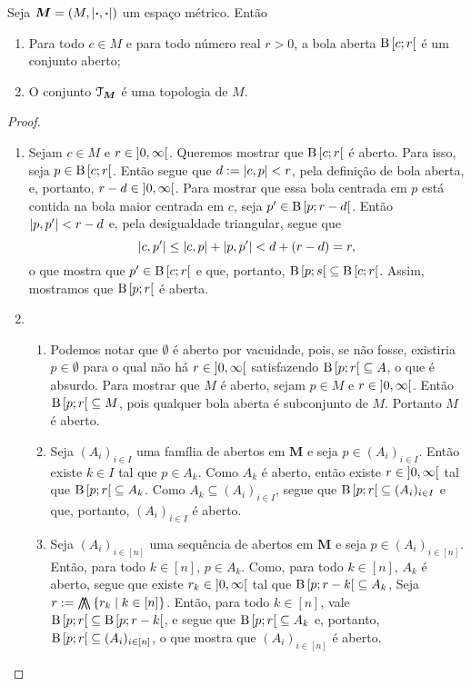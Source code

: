 \begin{proposition}
Seja $\bm M = (M,\left\vert{\bm{\cdot}},{\bm{\cdot}}\right\vert)$ um espaço métrico. Então
	\begin{enumerate}
	\item Para todo $c \in M$ e para todo número real $r > 0$, a bola aberta $\mathrm{B}\left[{c};{r}\right[$ é um conjunto aberto;
	\item O conjunto $\mathcal{T}_{\bm M}$ é uma topologia de $M$.
	\end{enumerate}
\end{proposition}
\begin{proof}
	\begin{enumerate}
	\item Sejam $c \in M$ e $r \in \left]{0},{\infty}\right[$. Queremos mostrar que $\mathrm{B}\left[{c};{r}\right[$ é aberto. Para isso, seja $p \in \mathrm{B}\left[{c};{r}\right[$. Então segue que $d := \left\vert{c},{p}\right\vert < r$, pela definição de bola aberta, e, portanto, $r-d \in \left]{0},{\infty}\right[$. Para mostrar que essa bola centrada em $p$ está contida na bola maior centrada em $c$, seja $p' \in \mathrm{B}\left[{p};{r-d}\right[$. Então $\left\vert{p},{p'}\right\vert<r-d$ e, pela desigualdade triangular, segue que
	\begin{equation*}
	\left\vert{c},{p'}\right\vert \leq \left\vert{c},{p}\right\vert + \left\vert{p},{p'}\right\vert < d + (r-d) = r,
	\end{equation*}
o que mostra que $p' \in \mathrm{B}\left[{c};{r}\right[$ e que, portanto, $\mathrm{B}\left[{p};{s}\right[ \subseteq \mathrm{B}\left[{c};{r}\right[$. Assim, mostramos que $\mathrm{B}\left[{p};{r}\right[$ é aberta.
	
	\item
		\begin{enumerate}
		\item Podemos notar que $\emptyset$ é aberto por vacuidade, pois, se não fosse, existiria $p \in \emptyset$ para o qual não há $r \in \left]{0},{\infty}\right[$ satisfazendo $\mathrm{B}\left[{p};{r}\right[ \subseteq A$, o que é absurdo.
	Para mostrar que $M$ é aberto, sejam $p \in M$ e $r \in \left]{0},{\infty}\right[$. Então $\mathrm{B}\left[{p};{r}\right[ \subseteq M$, pois qualquer bola aberta é subconjunto de $M$. Portanto $M$ é aberto.
	
		\item Seja $(A_i)_{i \in I}$ uma família de abertos em $\bm M$ e seja $p \in (A_i)_{i \in I}$. Então existe $k \in I$ tal que $p \in A_k$. Como $A_k$ é aberto, então existe $r \in \left]{0},{\infty}\right[$ tal que $\mathrm{B}\left[{p};{r}\right[ \subseteq A_k$. Como $A_k \subseteq (A_i)_{i \in I}$, segue que $\mathrm{B}\left[{p};{r}\right[ \subseteq (A_i)_{i \in I}$ e que, portanto, $(A_i)_{i \in I}$ é aberto.
	
		\item Seja $(A_i)_{i \in [n]}$ uma sequência de abertos em $\bm M$ e seja $p \in (A_i)_{i \in [n]}$. Então, para todo $k \in [n]$, $p \in A_k$. Como, para todo $k \in [n]$, $A_k$ é aberto, segue que existe $r_k \in \left]{0},{\infty}\right[$ tal que $\mathrm{B}\left[{p};{r-k}\right[ \subseteq A_k$, Seja $r := \min \set{r_k}{k \in [n]}$. Então, para todo $k \in [n]$, vale $\mathrm{B}\left[{p};{r}\right[ \subseteq \mathrm{B}\left[{p};{r-k}\right[$, e segue que $\mathrm{B}\left[{p};{r}\right[ \subseteq A_k$ e, portanto, $\mathrm{B}\left[{p};{r}\right[ \subseteq (A_i)_{i \in [n]}$, o que mostra que $(A_i)_{i \in [n]}$ é aberto.
		\end{enumerate}		
	\end{enumerate}
\end{proof}

